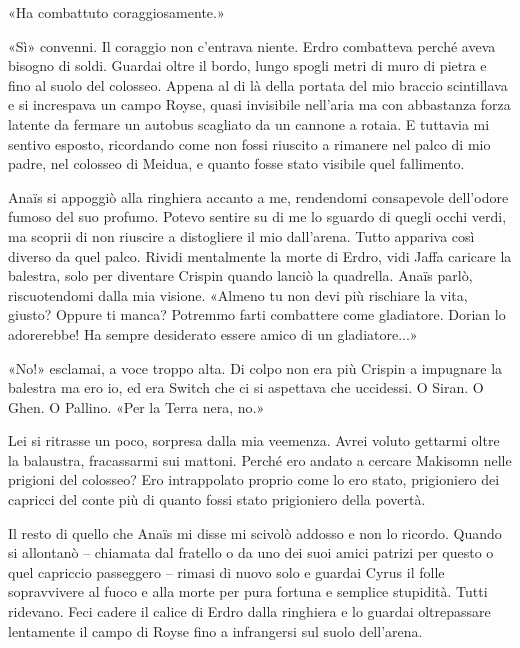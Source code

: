«Ha combattuto coraggiosamente.»

«Sì» convenni. Il coraggio non c'entrava niente. Erdro combatteva perché
aveva bisogno di soldi. Guardai oltre il bordo, lungo spogli metri di
muro di pietra e fino al suolo del colosseo. Appena al di là della
portata del mio braccio scintillava e si increspava un campo Royse,
quasi invisibile nell'aria ma con abbastanza forza latente da fermare un
autobus scagliato da un cannone a rotaia. E tuttavia mi sentivo esposto,
ricordando come non fossi riuscito a rimanere nel palco di mio padre,
nel colosseo di Meidua, e quanto fosse stato visibile quel fallimento.

Anaïs si appoggiò alla ringhiera accanto a me, rendendomi consapevole
dell'odore fumoso del suo profumo. Potevo sentire su di me lo sguardo di
quegli occhi verdi, ma scoprii di non riuscire a distogliere il mio
dall'arena. Tutto appariva così diverso da quel palco. Rividi
mentalmente la morte di Erdro, vidi Jaffa caricare la balestra, solo per
diventare Crispin quando lanciò la quadrella. {Anaïs} parlò,
riscuotendomi dalla mia visione. «Almeno tu non devi più rischiare la
vita, giusto? Oppure ti manca? Potremmo farti combattere come
gladiatore. Dorian lo adorerebbe! Ha sempre desiderato essere amico di
un gladiatore...»

«No!» esclamai, a voce troppo alta. Di colpo non era più Crispin a
impugnare la balestra ma ero io, ed era Switch che ci si aspettava che
uccidessi. O Siran. O Ghen. O Pallino. «Per la Terra nera, no.»

Lei si ritrasse un poco, sorpresa dalla mia veemenza. Avrei voluto
gettarmi oltre la balaustra, fracassarmi sui mattoni. Perché ero andato
a cercare Makisomn nelle prigioni del colosseo? Ero intrappolato proprio
come lo ero stato, prigioniero dei capricci del conte più di quanto
fossi stato prigioniero della povertà.

Il resto di quello che Anaïs mi disse mi scivolò addosso e non lo
ricordo. Quando si allontanò -- chiamata dal fratello o da uno dei suoi
amici patrizi per questo o quel capriccio passeggero -- rimasi di nuovo
solo e guardai Cyrus il folle sopravvivere al fuoco e alla morte per
pura fortuna e semplice stupidità. Tutti ridevano. Feci cadere il calice
di Erdro dalla ringhiera e lo guardai oltrepassare lentamente il campo
di Royse fino a infrangersi sul suolo dell'arena.


